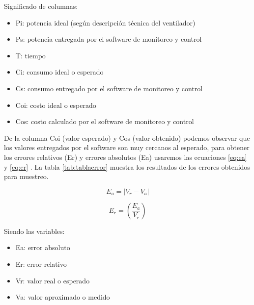 \vspace{0.1cm}
Significado de columnas:
\begin{itemize}
\item Pi: potencia ideal (según descripción técnica del ventilador) 
\item Ps: potencia entregada por el software de monitoreo y control
\item T: tiempo
\item Ci: consumo ideal o esperado
\item Cs: consumo entregado por el software de monitoreo y control
\item Coi: costo ideal o esperado
\item Cos: costo calculado por el software de monitoreo y control
\end{itemize}

\vspace{0.1cm}
De la columna Coi (valor esperado) y Cos (valor obtenido) podemos observar que los valores entregados por el software son muy cercanos al esperado, para obtener los errores relativos (Er) y errores absolutos (Ea) usaremos las ecuaciones  \ref{eq:ea} y \ref{eq:er} . La tabla \ref{tab:tablaerror} muestra los resultados de los errores obtenidos para muestreo.



\begin{equation}
	\label{eq:ea}
	E_a = \left| V_r - V_a \right|
\end{equation}

\begin{equation}
	\label{eq:er}
	E_r = \left( \frac{E_a}{V_r} \right)
\end{equation}

\vspace{0.1cm}
Siendo las variables:
\begin{itemize}
\item Ea: error absoluto 
\item Er: error relativo
\item Vr: valor real o esperado
\item Va: valor aproximado o medido
\end{itemize}

